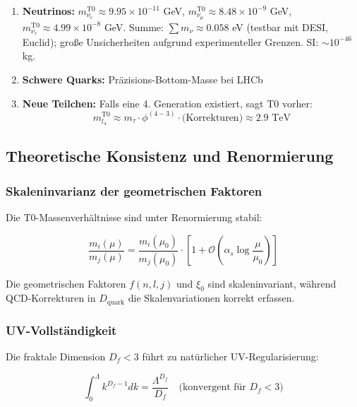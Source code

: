 	\begin{enumerate}
		\item \textbf{Neutrinos:} $m_{\nu_e}^{\text{T0}} \approx 9.95 \times 10^{-11}$ GeV, $m_{\nu_\mu}^{\text{T0}} \approx 8.48 \times 10^{-9}$ GeV, $m_{\nu_\tau}^{\text{T0}} \approx 4.99 \times 10^{-8}$ GeV. Summe: $\sum m_\nu \approx 0.058$ eV (testbar mit DESI, Euclid); große Unsicherheiten aufgrund experimenteller Grenzen. SI: $\sim 10^{-46}$ kg.
		
		\item \textbf{Schwere Quarks:} Präzisions-Bottom-Masse bei LHCb
		
		\item \textbf{Neue Teilchen:} Falls eine 4. Generation existiert, sagt T0 vorher:
		\begin{equation}
			m_{l_4}^{\text{T0}} \approx m_\tau \cdot \phi^{(4-3)} \cdot \text{(Korrekturen)} \approx 2.9 \text{ TeV}
		\end{equation}
	\end{enumerate}
	
	\subsection{Theoretische Konsistenz und Renormierung}
	
	\subsubsection{Skaleninvarianz der geometrischen Faktoren}
	
	Die T0-Massenverhältnisse sind unter Renormierung stabil:
	
	\begin{equation}
		\frac{m_i(\mu)}{m_j(\mu)} = \frac{m_i(\mu_0)}{m_j(\mu_0)} \cdot \left[1 + \mathcal{O}\left(\alpha_s \log\frac{\mu}{\mu_0}\right)\right]
	\end{equation}
	
	Die geometrischen Faktoren $f(n,l,j)$ und $\xi_0$ sind skaleninvariant, während QCD-Korrekturen in $D_{\text{quark}}$ die Skalenvariationen korrekt erfassen.
	
	\subsubsection{UV-Vollständigkeit}
	
	Die fraktale Dimension $D_f < 3$ führt zu natürlicher UV-Regularisierung:
	
	\begin{equation}
		\int_0^\Lambda k^{D_f-1} dk = \frac{\Lambda^{D_f}}{D_f} \quad \text{(konvergent für } D_f < 3\text{)}
	\end{equation}
	
